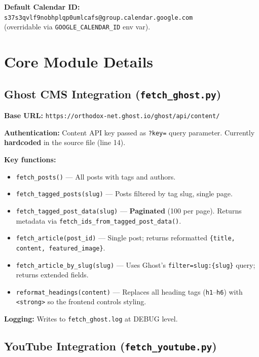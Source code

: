 \documentclass[12pt]{article}
\begin{document}
\textbf{Default Calendar ID:}\\
\texttt{s37s3qvlf9nobhplqp0umlcafs@group.calendar.google.com}\\
(overridable via \texttt{GOOGLE\_CALENDAR\_ID} env var).

\section{Core Module Details}

\subsection{Ghost CMS Integration (\texttt{fetch\_ghost.py})}

\textbf{Base URL:} \texttt{https://orthodox-net.ghost.io/ghost/api/content/}

\textbf{Authentication:} Content API key passed as \texttt{?key=} query parameter. Currently \textbf{hardcoded} in the source file (line 14).

\textbf{Key functions:}
\begin{itemize}
    \item \texttt{fetch\_posts()} --- All posts with tags and authors.
    \item \texttt{fetch\_tagged\_posts(slug)} --- Posts filtered by tag slug, single page.
    \item \texttt{fetch\_tagged\_post\_data(slug)} --- \textbf{Paginated} (100 per page). Returns metadata via \texttt{fetch\_ids\_from\_tagged\_post\_data()}.
    \item \texttt{fetch\_article(post\_id)} --- Single post; returns reformatted \texttt{\{title, content, featured\_image\}}.
    \item \texttt{fetch\_article\_by\_slug(slug)} --- Uses Ghost's \texttt{filter=slug:\{slug\}} query; returns extended fields.
    \item \texttt{reformat\_headings(content)} --- Replaces all heading tags (\texttt{h1}--\texttt{h6}) with \texttt{<strong>} so the frontend controls styling.
\end{itemize}

\textbf{Logging:} Writes to \texttt{fetch\_ghost.log} at DEBUG level.

\subsection{YouTube Integration (\texttt{fetch\_youtube.py})}
\end{document}
